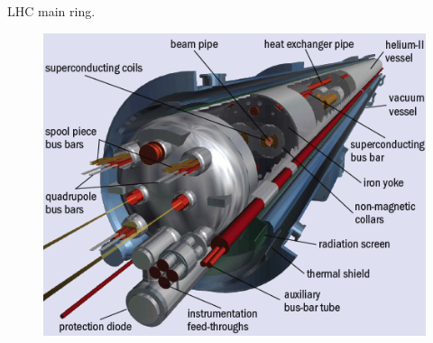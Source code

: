 \documentclass[8pt]{beamer}
\begin{document}
\begin{frame}[fragile]{LHC main ring.}
\begin{figure}[!tbp]
\begin{minipage}[b]{0.4\textwidth}
		\end{minipage}
		\hfill
		\begin{minipage}[b]{0.4\textwidth}
			\includegraphics[width=\textwidth]{4}
			
		\end{minipage}
	\end{figure}
\end{frame}

\end{document}
